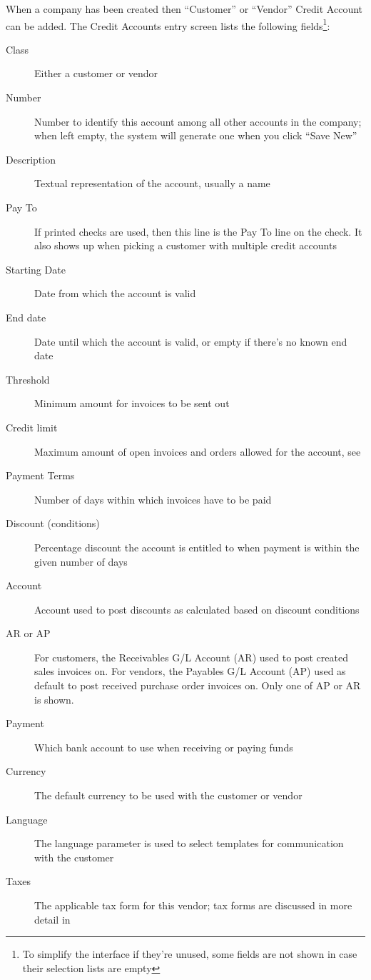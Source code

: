When a company has been created then ``Customer'' or ``Vendor''
Credit Account can be added. The Credit Accounts entry screen lists the
following fields\footnote{To simplify the interface if they're unused, some fields
are not shown in case their selection lists are empty}:

\begin{description}
\item [Class] Either a \gls{customer} or \gls{vendor} 
\item [Number] Number to identify this account among all other accounts in the company; when left empty, the system will generate one when you click ``Save New''
\item [Description] Textual representation of the account, usually a name
\item [Pay To] If printed checks are used, then this line is the Pay To line on the check. It also shows up when picking a customer with multiple credit accounts
\item [Starting Date] Date from which the account is valid
\item [End date] Date until which the account is valid, or empty if there's no known end date
\item [Threshold] Minimum amount for invoices to be sent out
\item [Credit limit] Maximum amount of open invoices and orders allowed for the account, see 
\item [Payment Terms] Number of days within which invoices have to be paid
\item [Discount (conditions)] Percentage discount the account is entitled to when payment is within the given number of days
\item [Account] Account used to post discounts as calculated based on discount conditions
\item [AR or AP] For customers, the Receivables G/L Account (AR) used to post created sales invoices on. For vendors, the Payables G/L Account (AP) used as default to post received purchase order invoices on. Only one of AP or AR is shown.
\item [Payment] Which bank account to use when receiving or paying funds
\item [Currency] The default currency to be used with the \gls{customer} or vendor
\item [Language] The language parameter is used to select templates for communication with the customer
\item [Taxes] The applicable tax form for this vendor; tax forms are discussed in more detail in 
\end{description}

